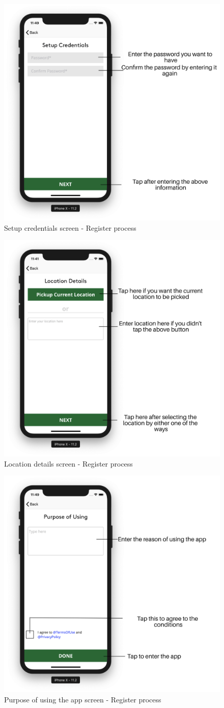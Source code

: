 \begin{itemize}
        \begin{figure}[H]
            \centering
            \includegraphics[width=0.50\linewidth]{figures/ch2/credentials_setup.png}
            \caption{\label{fig:credentials_setup} Setup credentials screen - Register process}
        \end{figure}
       
        
        \begin{figure}[H]
            \centering
            \includegraphics[width=0.50\linewidth]{figures/ch2/register_location.png}
            \caption{\label{fig:register_location} Location details screen - Register process}
        \end{figure}
 
        \begin{figure}[H]
            \centering
            \includegraphics[width=0.50\linewidth]{figures/ch2/purpose_app.png}
            \caption{\label{fig:purpose_app} Purpose of using the app screen - Register process}
        \end{figure}


\end{itemize}
